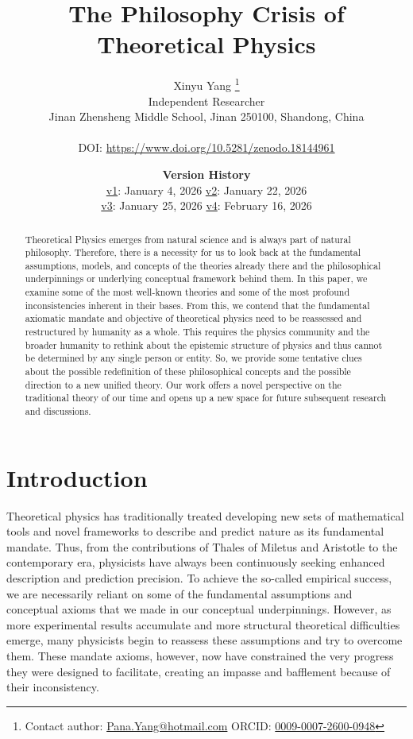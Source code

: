 \documentclass{article}
\title{The Philosophy Crisis of Theoretical Physics}
\date{\textbf{Version History} \\ 
      \small \href{https://www.doi.org/10.5281/zenodo.18144962}{v1}: January  4, 2026 \quad \href{https://www.doi.org/10.5281/zenodo.18340117}{v2}: January  22, 2026 \\
      \small \href{https://www.doi.org/10.5281/zenodo.18366882}{v3}: January  25, 2026 \quad
      \href{https://www.doi.org/10.5281/zenodo.18144961}{v4}: February  16, 2026 \\
}
\author{ \hspace{1mm}Xinyu Yang \orcidlink{0009-0007-2600-0948}\thanks{Contact author: \href{mailto:Pana.Yang@hotmail.com}{Pana.Yang@hotmail.com} ORCID: \href{https://orcid.org/0009-0007-2600-0948}{0009-0007-2600-0948}
} \\
Independent Researcher \\
Jinan Zhensheng Middle School, Jinan 250100, Shandong, China \\
\\
DOI: \href{https://www.doi.org/10.5281/zenodo.18144961}{https://www.doi.org/10.5281/zenodo.18144961 }
}
\begin{document}
\maketitle

\begin{abstract}
Theoretical Physics emerges from natural science and is always part of natural philosophy. Therefore, there is a necessity for us to look back at the fundamental assumptions, models, and concepts of the theories already there and the philosophical underpinnings or underlying conceptual framework behind them. In this paper, we examine some of the most well-known theories and some of the most profound inconsistencies inherent in their bases. From this, we contend that the fundamental axiomatic mandate and objective of theoretical physics need to be reassessed and restructured by humanity as a whole. This requires the physics community and the broader humanity to rethink about the epistemic structure of physics and thus cannot be determined by any single person or entity. So, we provide some tentative clues about the possible redefinition of these philosophical concepts and the possible direction to a new unified theory. Our work offers a novel perspective on the traditional theory of our time and opens up a new space for future subsequent research and discussions. 
\end{abstract}


\section{Introduction}

Theoretical physics has traditionally treated developing new sets of mathematical tools and novel frameworks to describe and predict nature as its fundamental mandate. Thus, from the contributions of Thales of Miletus and Aristotle to the contemporary era, physicists have always been continuously seeking enhanced description and prediction precision. To achieve the so-called empirical success, we are necessarily reliant on some of the fundamental assumptions and conceptual axioms that we made in our conceptual underpinnings. However, as more experimental results accumulate and more structural theoretical difficulties emerge, many physicists begin to reassess these assumptions and try to overcome them. These mandate axioms, however, now have constrained the very progress they were designed to facilitate, creating an impasse and bafflement because of their inconsistency. 
\end{document}
